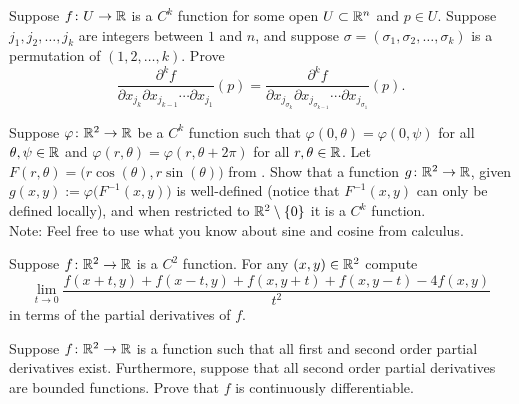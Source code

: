 \begin{exercise}
Suppose $f \colon U \to {\mathbb{R}}$ is a $C^k$ function for some open $U \subset
{\mathbb{R}}^n$ and $p \in U$.  Suppose $j_1,j_2,\ldots,j_k$ are integers between $1$
and $n$, and suppose $\sigma=(\sigma_1,\sigma_2,\ldots,\sigma_k)$ is a
permutation of $(1,2,\ldots,k)$.  Prove
\begin{equation*}
\frac{\partial^{k} f}{\partial x_{j_{k}} \partial x_{j_{k-1}}
\cdots \partial x_{j_1}} (p)
=
\frac{\partial^{k} f}{\partial x_{j_{\sigma_k}} \partial
x_{j_{\sigma_{k-1}}}
\cdots \partial x_{j_{\sigma_1}}} (p) .
\end{equation*}
\end{exercise}

\begin{exercise}
Suppose $\varphi \colon {\mathbb{R}}^2 \to {\mathbb{R}}$ be a $C^k$ function
such that
$\varphi(0,\theta) = \varphi(0,\psi)$ for all $\theta,\psi \in {\mathbb{R}}$
and
$\varphi(r,\theta) = \varphi(r,\theta+2\pi)$ for all $r,\theta \in {\mathbb{R}}$.
Let $F(r,\theta) = \bigl(r \cos(\theta), r \sin(\theta) \bigr)$ from 
.  Show that a function
$g \colon {\mathbb{R}}^2 \to {\mathbb{R}}$, given
$g(x,y) := \varphi \bigl(F^{-1}(x,y)\bigr)$ is well-defined (notice that
$F^{-1}(x,y)$ can only be defined locally), and
when restricted to ${\mathbb{R}}^2 \setminus \{ 0 \}$ it is a $C^k$ function.
\\
Note: Feel free to use what you know about sine and cosine from calculus.
\end{exercise}

\begin{exercise}
Suppose $f \colon {\mathbb{R}}^2 \to {\mathbb{R}}$ is a $C^2$ function.
For any $(x,y) \in {\mathbb{R}}^2$ compute
\begin{equation*}
\lim_{t \to 0}
\frac{f(x+t,y)+f(x-t,y)+f(x,y+t)+f(x,y-t) - 4f(x,y)}{t^2}
\end{equation*}
in terms of the partial derivatives of $f$.
\end{exercise}

\begin{exercise}
Suppose $f \colon {\mathbb{R}}^2 \to {\mathbb{R}}$ is a function such that
all first and second order partial derivatives exist.  Furthermore,
suppose that all second order partial derivatives are bounded functions.
Prove that $f$ is continuously differentiable.
\end{exercise}

